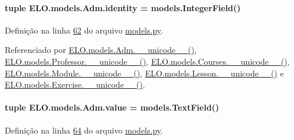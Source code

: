 \hypertarget{classELO_1_1models_1_1Adm_af7e7b797ce5d3396e8a54d8927450d75}{}
\paragraph[{identity}]{\setlength{\rightskip}{0pt plus 5cm}tuple E\+L\+O.\+models.\+Adm.\+identity = models.\+Integer\+Field()\hspace{0.3cm}{\ttfamily [static]}}\label{classELO_1_1models_1_1Adm_af7e7b797ce5d3396e8a54d8927450d75}


Definição na linha \hyperlink{ELO_2models_8py_source_l00062}{62} do arquivo \hyperlink{ELO_2models_8py_source}{models.\+py}.



Referenciado por \hyperlink{classELO_1_1models_1_1Adm_a321eaeaced2b6423fd23ad9d0401808e}{E\+L\+O.\+models.\+Adm.\+\_\+\+\_\+unicode\+\_\+\+\_\+()}, \hyperlink{classELO_1_1models_1_1Professor_a8c0714e4a283c139c0d7aed94a498a7b}{E\+L\+O.\+models.\+Professor.\+\_\+\+\_\+unicode\+\_\+\+\_\+()}, \hyperlink{classELO_1_1models_1_1Courses_a8676cba71b99ab2ba60726b9b5e33825}{E\+L\+O.\+models.\+Courses.\+\_\+\+\_\+unicode\+\_\+\+\_\+()}, \hyperlink{classELO_1_1models_1_1Module_a8fc9fadf09fa7b3bbcfea69ebe25d278}{E\+L\+O.\+models.\+Module.\+\_\+\+\_\+unicode\+\_\+\+\_\+()}, \hyperlink{classELO_1_1models_1_1Lesson_a53e265de97c6b73f262f62a80f9ca994}{E\+L\+O.\+models.\+Lesson.\+\_\+\+\_\+unicode\+\_\+\+\_\+()} e \hyperlink{classELO_1_1models_1_1Exercise_a23f81c66e4d6bc5a4582d74d191f5117}{E\+L\+O.\+models.\+Exercise.\+\_\+\+\_\+unicode\+\_\+\+\_\+()}.

\hypertarget{classELO_1_1models_1_1Adm_a98f249c493fbcbcd347297437a098212}{}
\paragraph[{value}]{\setlength{\rightskip}{0pt plus 5cm}tuple E\+L\+O.\+models.\+Adm.\+value = models.\+Text\+Field()\hspace{0.3cm}{\ttfamily [static]}}\label{classELO_1_1models_1_1Adm_a98f249c493fbcbcd347297437a098212}


Definição na linha \hyperlink{ELO_2models_8py_source_l00064}{64} do arquivo \hyperlink{ELO_2models_8py_source}{models.\+py}.



